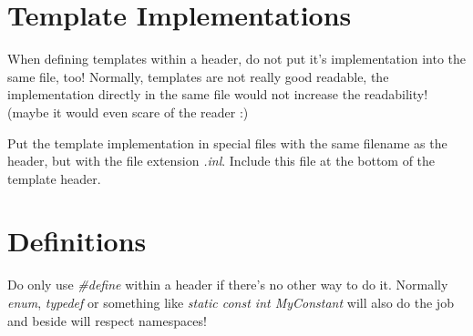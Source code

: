 \section{Template Implementations}
When defining templates within a header, do not put it's implementation into the same file, too! Normally, templates are not really good readable, the implementation directly in the same file would not increase the readability! (maybe it would even scare of the reader :)

Put the template implementation in special files with the same filename as the header, but with the file extension \emph{.inl}. Include this file at the bottom of the template header.




\section{Definitions}
Do only use \emph{\#define} within a header if there's no other way to do it. Normally \emph{enum}, \emph{typedef} or something like \emph{static const int MyConstant} will also do the job and beside will respect namespaces!
